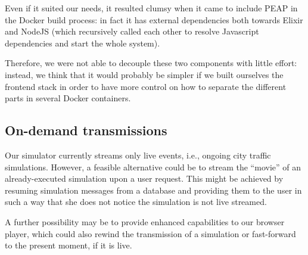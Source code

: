 Even if it suited our needs, it resulted clumsy when it came to include PEAP
in the Docker build process: in fact it has external dependencies both towards
Elixir and NodeJS (which recursively called each other to resolve
Javascript dependencies and start the whole system).

Therefore, we were not able to decouple these two components with little
effort: instead, we think that it would probably be simpler if we built
ourselves the frontend stack in order to have more control on how to separate
the different parts in several Docker containers.

\subsection{On-demand transmissions}
Our simulator currently streams only live events, i.e., ongoing city traffic
simulations. However, a feasible alternative could be to stream the ``movie''
of an already-executed simulation upon a user request.
This might be achieved by resuming simulation messages from a database and
providing them to the user in such a way that she does not notice the
simulation is not live streamed.

A further possibility may be to provide enhanced capabilities to our browser
player, which could also rewind the transmission of a simulation or
fast-forward to the present moment, if it is live.
